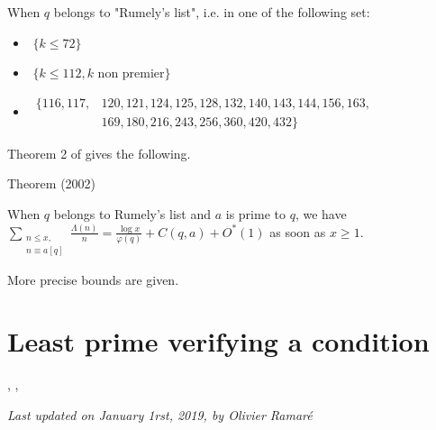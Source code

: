 \par 
  When $q$ belongs to "Rumely's list", i.e. in one of the
following set:
\begin{itemize}
    \item \,\,$\{k\le 72\}$

    \item \,\,$\{k\le 112, \text{$k$ non premier}\}$

    \item \,$\begin{aligned}\{116, 117, &120, 121, 124, 125, 128, 132, 140,
     143, 144, 156, 163, \\ &169, 180, 216, 243, 256, 360, 420, 432\}\end{aligned}$

\end{itemize}
Theorem 2 of
\cite{Ramare*02}
gives the following.
\begin{thm}{Theorem (2002)}

  When $q$ belongs to Rumely's list and $a$ is prime to $q$, we have
  $\displaystyle
  \sum_{\substack{n\le x,\\ n\equiv a[q]}}\frac{\Lambda(n)}{n}
  =\frac{\log x}{\varphi(q)}+C(q,a)+O^*(1)
  $
  as soon as $x\ge1$.
\end{thm}

More precise bounds are given.




\section{Least prime verifying a condition}


\cite{Bach-Sorenson*96},
\cite{Kadiri*05-2},







  
\begin{flushright}\small\sl{}   Last updated on January 1rst, 2019, by Olivier Ramar\'e
 \end{flushright}
















